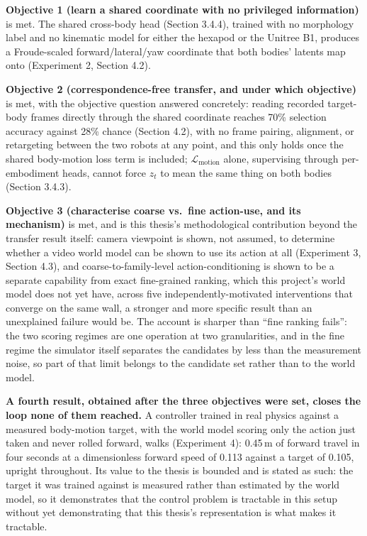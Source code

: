 \documentclass[12pt,a4paper,oneside]{report}
\begin{document}
\noindent\textbf{Objective 1 (learn a shared coordinate with no privileged information)} is met. The shared
cross-body head (Section 3.4.4), trained with no morphology label and no kinematic model for either the hexapod
or the Unitree B1, produces a Froude-scaled forward/lateral/yaw coordinate that both bodies' latents map onto
(Experiment 2, Section 4.2).

\noindent\textbf{Objective 2 (correspondence-free transfer, and under which objective)} is met, with the objective
question answered concretely: reading recorded target-body frames directly through the shared coordinate reaches
70\% selection accuracy against 28\% chance (Section 4.2), with no frame pairing, alignment, or retargeting
between the two robots at any point, and this only holds once the shared body-motion loss term is included;
$\mathcal{L}_{\text{motion}}$ alone, supervising through per-embodiment heads, cannot force $z_t$ to mean the same
thing on both bodies (Section 3.4.3).

\noindent\textbf{Objective 3 (characterise coarse vs.\ fine action-use, and its mechanism)} is met, and is this
thesis's methodological contribution beyond the transfer result itself: camera viewpoint is shown, not assumed, to
determine whether a video world model can be shown to use its action at all (Experiment 3, Section 4.3), and
coarse-to-family-level action-conditioning is shown to be a separate capability from exact fine-grained ranking,
which this project's world model does not yet have, across five independently-motivated interventions that
converge on the same wall, a stronger and more specific result than an unexplained failure would be. The account is
sharper than ``fine ranking fails'': the two scoring regimes are one operation at two granularities, and in the
fine regime the simulator itself separates the candidates by less than the measurement noise, so part of that limit
belongs to the candidate set rather than to the world model.

\noindent\textbf{A fourth result, obtained after the three objectives were set, closes the loop none of them
reached.} A controller trained in real physics against a measured body-motion target, with the world model scoring
only the action just taken and never rolled forward, walks (Experiment 4): 0.45\,m of forward travel in four
seconds at a dimensionless forward speed of 0.113 against a target of 0.105, upright throughout. Its value to the
thesis is bounded and is stated as such: the target it was trained against is measured rather than estimated by the
world model, so it demonstrates that the control problem is tractable in this setup without yet demonstrating that
this thesis's representation is what makes it tractable.
\end{document}
